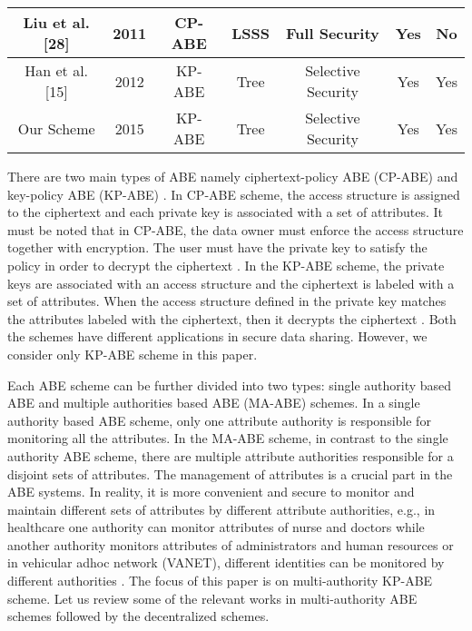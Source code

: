 \documentclass[10pt,journal]{IEEEtran}
\begin{document}
\begin{table*}[!ht]
\begin{tabular}{|c|c|c|c|c|c|c|}
Liu et al. {[}28{]}         & 2011 & CP-ABE    & LSSS                                                       & Full Security      & Yes                                                                           & No                                                     \\ \hline
Han et al. {[}15{]}         & 2012 & KP-ABE    & Tree                                                       & Selective Security & Yes                                                                           & Yes                                                    \\ \hline
Our Scheme                  & 2015 & KP-ABE    & Tree                                                       & Selective Security & Yes                                                                           & Yes                                                    \\ \hline
\end{tabular}
\end{table*}

There are two main types of ABE namely ciphertext-policy ABE (CP-ABE) and key-policy ABE (KP-ABE) \cite{kpabe,cpabe}. In CP-ABE scheme, the access structure is assigned to the ciphertext and each private key is associated with a set of attributes. It must be noted that in CP-ABE, the data owner must enforce the access structure together with encryption. The user must have the private key to satisfy the policy in order to decrypt the ciphertext \cite{cpabe}. In the KP-ABE scheme, the private keys are associated with an access structure and the ciphertext is labeled with a set of attributes. When the access structure defined in the private key matches the attributes labeled with the ciphertext, then it decrypts the ciphertext \cite{kpabe}. Both the schemes have different applications in secure data sharing. However, we consider only KP-ABE scheme in this paper.


Each ABE scheme can be further divided into  two types: single authority based ABE \cite{kpabe} and multiple authorities based ABE (MA-ABE)  \cite{imaabe} schemes. In a single authority based ABE scheme, only one attribute authority is responsible for monitoring all the attributes. In the MA-ABE scheme, in contrast to the single authority ABE scheme, there are multiple attribute authorities responsible for a disjoint sets of attributes. The management of attributes is a crucial part in the ABE systems.  In reality, it is more convenient and secure to monitor and maintain different sets of attributes  by different attribute authorities, e.g., in healthcare one authority can monitor attributes of nurse and doctors while another authority monitors attributes of  administrators and human resources \cite{Rahul2} or in vehicular adhoc network (VANET), different identities can be monitored by different authorities \cite{Rahul3, Rahul4}. The focus of this paper is on multi-authority KP-ABE scheme. Let us review some of the relevant works in multi-authority ABE schemes followed by the decentralized schemes.
\end{document}
